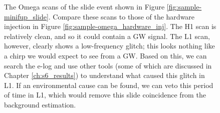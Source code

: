 \begin{figure}[p]
\center
{}
\label{fig:sample-omega_slide}
\caption{The Omega scans of the slide event shown in Figure
\ref{fig:sample-minifup_slide}. Compare these scans to those of the hardware
injection in Figure \ref{fig:sample-omega_hardware_inj}. The H1 scan is
relatively clean, and so it could contain a GW signal. The L1 scan, however,
clearly shows a low-frequency glitch; this looks nothing like a chirp we would
expect to see from a GW. Based on this, we can search the e-log and use other
tools (some of which are discussed in Chapter \ref{ch:s6_results}) to
understand what caused this glitch in L1. If an environmental cause can be
found, we can veto this period of time in L1, which would remove this slide
coincidence from the background estimation.} 
\end{figure}

